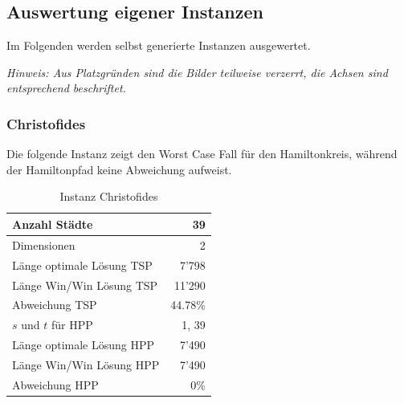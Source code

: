 \documentclass[11pt,a4paper]{article}
\begin{document}
\subsection{Auswertung eigener Instanzen}
Im Folgenden werden selbst generierte Instanzen ausgewertet. 

\begin{flushleft}
\emph{Hinweis: Aus Platzgründen sind die Bilder teilweise verzerrt, die Achsen sind entsprechend beschriftet.}
\end{flushleft}

\subsubsection{Christofides}
Die folgende Instanz zeigt den Worst Case Fall für den Hamiltonkreis, während der Hamiltonpfad keine Abweichung aufweist.

        \begin{table}[H]
                \centering
                \begin{tabular}{| l | r |}
                    \hline
                        Anzahl Städte               & 39            \\ \hline
                        Dimensionen                 & 2             \\ \hline
                        Länge optimale Lösung TSP   & 7'798         \\ \hline
                        Länge Win/Win Lösung  TSP   & 11'290        \\ \hline
                        Abweichung TSP              & 44.78\%       \\ \hline
                        $s$ und $t$ für HPP         & 1, 39         \\ \hline
                        Länge optimale Lösung HPP   & 7'490         \\ \hline
                        Länge Win/Win Lösung  HPP   & 7'490         \\ \hline
                        Abweichung HPP              & 0\%           \\ \hline
                \end{tabular}
                \caption{Instanz Christofides}
                \label{tab:instanz_christofides}
        \end{table}
\end{document}
